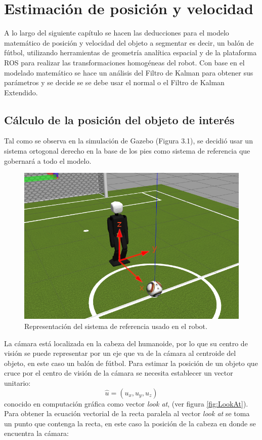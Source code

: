 \chapter{Estimación de posición y velocidad}

	A lo largo del siguiente capítulo se hacen las deducciones para el modelo matemático de posición y velocidad del objeto a segmentar es decir, un balón de fútbol, utilizando herramientas de geometría analítica espacial y de la plataforma ROS para realizar las transformaciones homogéneas del robot.
	Con base en el modelado matemático se hace un análisis del Filtro de Kalman para obtener sus parámetros y se decide se se debe usar el normal o el Filtro de Kalman Extendido.
	
	\section{Cálculo de la posición del objeto de interés}
Tal como se observa en la simulación de Gazebo (Figura 3.1), se decidió usar un sistema ortogonal derecho en la base de los pies como sistema de referencia que gobernará a todo el modelo.

\begin{figure}
	\centering		
	\includegraphics[scale=2]{images/robot_ejes.png}
	\caption{Representación del sistema de referencia usado en el robot.}		
\end{figure}

La cámara está localizada en la cabeza del humanoide, por lo que su centro
de visión se puede representar por un eje que va de la cámara al centroide del 
objeto, en este caso un balón de fútbol.
Para estimar la posición de un objeto que cruce por el centro de visión de la
cámara se necesita establecer un vector unitario:
\[\hat{u} = (u_x, u_y, u_z)\]
conocido en computación gráfica como vector \textit{look at}, (ver figura \ref{fig:LookAt}). Para obtener la ecuación vectorial de la recta paralela al vector \textit{look at} se toma un punto que contenga la recta, en este caso la posición de la cabeza en donde se encuentra la cámara: 

